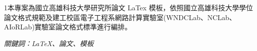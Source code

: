 \renewcommand{\abstractname}{摘要}
\clearpage
{}
\addchaptertocentry{\abstractname}
\begin{cntabstract}
\n 1本專案為國立高雄科技大學研究所論文 LaTex 模板，依照國立高雄科技大學學位論文格式規範及建工校區電子工程系網路計算實驗室(WNDCLab、NCLab、AIoRLab)實驗室論文格式標準進行編排。

\hbox{}
\it 關鍵詞：LaTeX、論文、模板
\end{cntabstract}